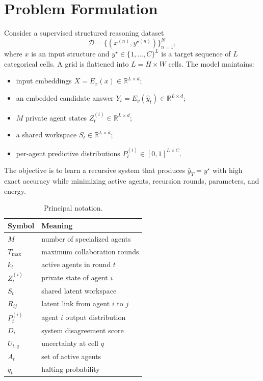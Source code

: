 \documentclass[10pt,a4paper,twocolumn]{article}
\newcommand{\R}{\mathbb{R}}
\begin{document}
\section{Problem Formulation}
Consider a supervised structured reasoning dataset
\begin{equation}
\mathcal{D}=\{(x^{(n)},y^{\star(n)})\}_{n=1}^{N},
\end{equation}
where $x$ is an input structure and $y^\star\in\{1,\ldots,C\}^{L}$ is a target sequence of $L$ categorical cells. A grid is flattened into $L=H\times W$ cells. The model maintains:
\begin{itemize}
\item input embeddings $X=E_x(x)\in\R^{L\times d}$;
\item an embedded candidate answer $Y_t=E_y(\hat y_t)\in\R^{L\times d}$;
\item $M$ private agent states $Z_t^{(i)}\in\R^{L\times d}$;
\item a shared workspace $S_t\in\R^{L\times d}$;
\item per-agent predictive distributions $P_t^{(i)}\in[0,1]^{L\times C}$.
\end{itemize}
The objective is to learn a recursive system that produces $\hat y_T=y^\star$ with high exact accuracy while minimizing active agents, recursion rounds, parameters, and energy.

\begin{table}[t]
\caption{Principal notation.}
\label{tab:notation}
\centering
\small
\begin{tabular}{ll}
\toprule
Symbol & Meaning \\
\midrule
$M$ & number of specialized agents \\
$T_{\max}$ & maximum collaboration rounds \\
$k_t$ & active agents in round $t$ \\
$Z_t^{(i)}$ & private state of agent $i$ \\
$S_t$ & shared latent workspace \\
$R_{ij}$ & latent link from agent $i$ to $j$ \\
$P_t^{(i)}$ & agent $i$ output distribution \\
$D_t$ & system disagreement score \\
$U_{t,q}$ & uncertainty at cell $q$ \\
$A_t$ & set of active agents \\
$q_t$ & halting probability \\
\bottomrule
\end{tabular}
\end{table}
\end{document}
